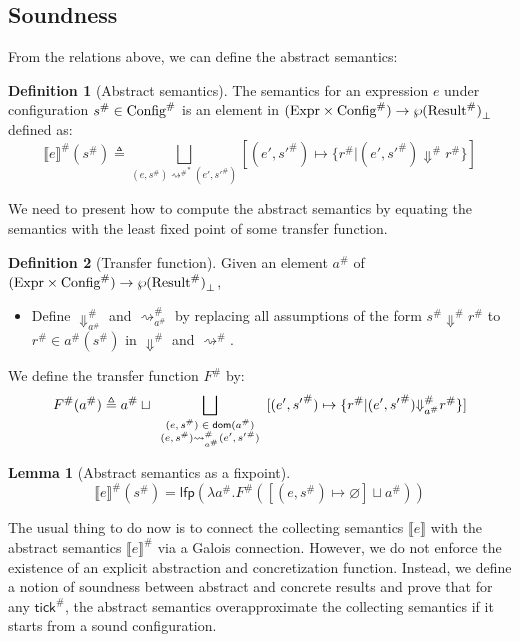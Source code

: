 \documentclass{article}
\theoremstyle{definition}
\newtheorem{definition}{Definition}[section]
\newtheorem{lem}{Lemma}[section]
\newcommand*{\A}[1]{{#1}^{\#}}
\newcommand*{\Expr}{\text{Expr}}
\newcommand*{\Time}{\mathbb{T}}
\newcommand*{\ATime}{\A{\Time}}
\newcommand*{\AConfig}[1]{\A{\text{Config}}\vphantom{#1}}
\newcommand*{\AResult}[1]{\A{\text{Result}}\vphantom{#1}}
\newcommand*{\sembracket}[1]{\lBrack{#1}\rBrack}
\newcommand*{\tick}{\mathsf{tick}}
\begin{document}
\subsection{Soundness}

From the relations above, we can define the abstract semantics:
\begin{definition}[Abstract semantics]
  The semantics for an expression $e$ under configuration $\A{s}\in\AConfig{\ATime}$ is an element in $(\Expr\times\AConfig{\ATime})\rightarrow{\wp(\AResult{\ATime})}_{\bot}$ defined as:
  \[
    \A{\sembracket{e}}(\A{s})\triangleq\bigsqcup_{(e,\A{s}){\A\rightsquigarrow}^{*}(e',\A{s'})}[(e',\A{s'})\mapsto\{\A{r}|(e',\A{s'})\A\Downarrow \A{r}\}]
  \]
\end{definition}

We need to present how to compute the abstract semantics by equating the semantics with the least fixed point of some transfer function.

\begin{definition}[Transfer function]
  Given an element $\A{a}$ of $(\Expr\times\AConfig{\ATime})\rightarrow{\wp(\AResult{\ATime})}_{\bot}$,

  \begin{itemize}
    \item Define $\A{\Downarrow}_{\A{a}}$ and $\A{\rightsquigarrow}_{\A{a}}$ by replacing all assumptions of the form $\A{s}\A\Downarrow\A{r}$ to $\A{r}\in\A{a}(\A{s})$ in $\A\Downarrow$ and $\A\rightsquigarrow$.
  \end{itemize}

  We define the transfer function $\A{F}$ by:
  \[
    \A{F}(\A{a})\triangleq\A{a}\sqcup\bigsqcup_{
    \scriptsize
    \begin{array}{c}
      (e,\A{s})\in\mathsf{dom}(\A{a}) \\
      (e,\A{s})\A{\rightsquigarrow}_{\A{a}}(e',\A{s'})
    \end{array}}[(e',\A{s'})\mapsto\{\A{r}|(e',\A{s'})\A{\Downarrow}_{\A{a}}\A{r}\}]
  \]
\end{definition}

\begin{lem}[Abstract semantics as a fixpoint]
  \[
    \A{\sembracket{e}}(\A{s})=\mathsf{lfp}(\lambda \A{a}.\A{F}([(e,\A{s})\mapsto\varnothing]\sqcup\A{a}))
  \]
\end{lem}

The usual thing to do now is to connect the collecting semantics $\sembracket{e}$ with the abstract semantics $\A{\sembracket{e}}$ via a Galois connection.
However, we do not enforce the existence of an explicit abstraction and concretization function.
Instead, we define a notion of soundness between abstract and concrete results and prove that for any $\A{\tick}$, the abstract semantics overapproximate the collecting semantics if it starts from a sound configuration.
\end{document}
